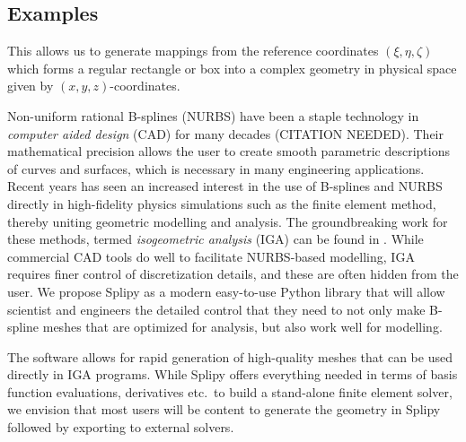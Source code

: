 \documentclass[landscape]{sintefposter}
\begin{document}
\begin{multicols}{3}
\section{Examples}
This allows us to generate mappings from the reference coordinates $(\xi,\eta,\zeta)$ which forms a regular rectangle or box into a complex geometry in physical space given by $(x,y,z)$-coordinates.

\vspace{1cm}

Non-uniform rational B-splines (NURBS) have been a staple technology in \emph{computer aided design} (CAD) for many decades (CITATION NEEDED).
Their mathematical precision allows the user to create smooth parametric descriptions of curves and surfaces, which is necessary in many engineering applications.
Recent years has seen an increased interest in the use of B-splines and NURBS directly in high-fidelity physics simulations such as the finite element method, thereby uniting geometric modelling and analysis.
The groundbreaking work for these methods, termed \emph{isogeometric analysis} (IGA) can be found in \cite{hughes2005iac}.
While commercial CAD tools do well to facilitate NURBS-based modelling, IGA requires finer control of discretization details, and these are often hidden from the user.
We propose Splipy as a modern easy-to-use Python library that will allow scientist and engineers the detailed control that they need to not only make B-spline meshes that are optimized for analysis, but also work well for modelling.

The software allows for rapid generation of high-quality meshes that can be used directly in IGA programs.
While Splipy offers everything needed in terms of basis function evaluations, derivatives etc.~to build a stand-alone finite element solver, we envision that most users will be content to generate the geometry in Splipy followed by exporting to external solvers.


\end{multicols}
\end{document}
